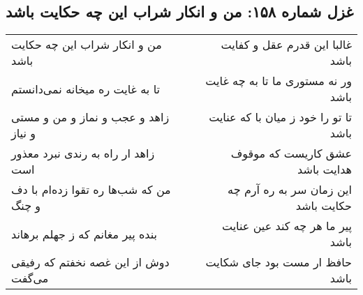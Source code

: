 \begin{center}
\section*{غزل شماره ۱۵۸: من و انکار شراب این چه حکایت باشد}
\label{sec:sh158}
\begin{longtable}{l p{0.5cm} r}
من و انکار شراب این چه حکایت باشد
&&
غالبا این قدرم عقل و کفایت باشد
\\
تا به غایت ره میخانه نمی‌دانستم
&&
ور نه مستوری ما تا به چه غایت باشد
\\
زاهد و عجب و نماز و من و مستی و نیاز
&&
تا تو را خود ز میان با که عنایت باشد
\\
زاهد ار راه به رندی نبرد معذور است
&&
عشق کاریست که موقوف هدایت باشد
\\
من که شب‌ها ره تقوا زده‌ام با دف و چنگ
&&
این زمان سر به ره آرم چه حکایت باشد
\\
بنده پیر مغانم که ز جهلم برهاند
&&
پیر ما هر چه کند عین عنایت باشد
\\
دوش از این غصه نخفتم که رفیقی می‌گفت
&&
حافظ ار مست بود جای شکایت باشد
\\
\end{longtable}
\end{center}
